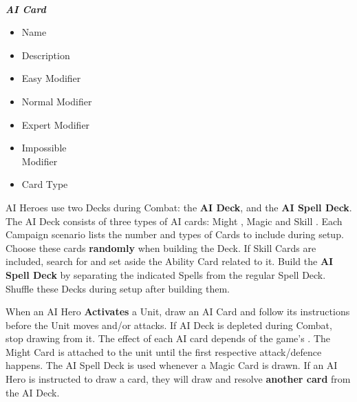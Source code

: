 \begin{multicols}{2}
\begin{multicols*}{2}
  \begin{center}
    \vspace*{-1.5em}
    \\
    \phantom{\ldots\ldots}\footnotesize{\textbf{\textit{\textcolor{darkcandyapplered}{AI Card}}}}
    \vspace*{-1em}
  \end{center}
  \vspace*{\fill}
  \columnbreak
  \scriptsize
  \begin{itemize}[itemsep=0pt]
    \item[\textbf{1.}] Name
    \item[\textbf{2.}] Description
    \item[\textbf{3.}] Easy Modifier
    \item[\textbf{4.}] Normal Modifier
    \item[\textbf{5.}] Expert Modifier
    \item[\textbf{6.}] Impossible\\Modifier
    \item[\textbf{7.}] Card Type
  \end{itemize}\vspace*{\fill}
\end{multicols*}

AI Heroes use two Decks during Combat: the \textbf{AI Deck}, and the \textbf{AI Spell Deck}.
The AI Deck consists of three types of AI cards: Might , Magic  and Skill .
Each Campaign scenario lists the number and types of Cards to include during setup.
Choose these cards \textbf{randomly} when building the Deck.
If Skill Cards are included, search for and set aside the Ability Card related to it.
Build the \textbf{AI Spell Deck} by separating the indicated Spells from the regular Spell Deck.
Shuffle these Decks during setup after building them.

When an AI Hero \textbf{Activates} a Unit, draw an AI Card and follow its instructions before the Unit moves and/or attacks.
If AI Deck is depleted during Combat, stop drawing from it.
The effect of each AI card depends of the game's .
The Might Card  is attached to the unit until the first respective attack/defence happens.
The AI Spell Deck is used whenever a Magic Card  is drawn.
If an AI Hero is instructed to draw a card, they will draw and resolve \textbf{another card} from the AI Deck.


\end{multicols}
